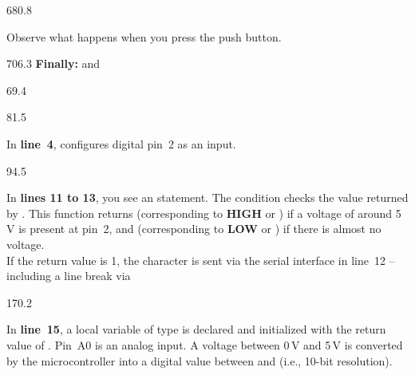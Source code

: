 \documentclass{aslab}
\begin{document}
\begin{region}{680.8}
\begin{dashlist}
\item Observe what happens when you press the push button.
\end{dashlist}
\end{region}

\begin{region}{706.3}
\textbf{Finally:}  and 
\end{region}

\nextpage
\begin{region}{69.4}
\end{region}

\begin{region}{81.5}
\begin{dashlist}
\item In \textbf{line~4},  configures digital pin~2
  as an input.
\end{dashlist}
\end{region}

\begin{region}[pitch=12.72]{94.5}
\begin{dashlist}
\item In \textbf{lines 11 to 13}, you see an  statement. The
  condition checks the value returned by . This function
  returns  (corresponding to \textbf{HIGH} or ) if a
  voltage of around 5\,V is present at pin~2, and  (corresponding to
  \textbf{LOW} or ) if there is almost no voltage.\\
  If the return value is 1, the character  is sent via the serial
  interface in line~12 -- including a line break via
\end{dashlist}
\end{region}

\begin{region}[pitch=12.53,free]{170.2}
\begin{dashlist}
\item In \textbf{line~15}, a local variable  of type
   is declared and initialized with the return value of
  . Pin~A0 is an analog input. A voltage between 0\,V
  and 5\,V is converted by the microcontroller into a digital value between
   and  (i.e., 10-bit resolution).
\end{dashlist}
\end{region}
\end{document}
